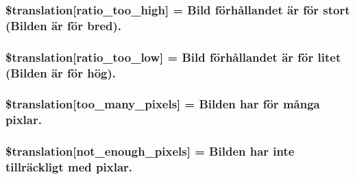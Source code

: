 \subsubsection[{\$translation}]{\setlength{\rightskip}{0pt plus 5cm}\$translation\mbox{[}\textquotesingle{}ratio\+\_\+too\+\_\+high\textquotesingle{}\mbox{]} = \textquotesingle{}Bild förhållandet är för stort (Bilden är för bred).\textquotesingle{}}\label{class_8upload_8sv___s_e_8php_a23396f6ce7f31e5e5f1b57580621d982}
\hypertarget{class_8upload_8sv___s_e_8php_ac533b9a479f056b0b8623e4268f068c2}{}
\subsubsection[{\$translation}]{\setlength{\rightskip}{0pt plus 5cm}\$translation\mbox{[}\textquotesingle{}ratio\+\_\+too\+\_\+low\textquotesingle{}\mbox{]} = \textquotesingle{}Bild förhållandet är för litet (Bilden är för hög).\textquotesingle{}}\label{class_8upload_8sv___s_e_8php_ac533b9a479f056b0b8623e4268f068c2}
\hypertarget{class_8upload_8sv___s_e_8php_aa4051ef64e94a3f8295c63cf85544016}{}
\subsubsection[{\$translation}]{\setlength{\rightskip}{0pt plus 5cm}\$translation\mbox{[}\textquotesingle{}too\+\_\+many\+\_\+pixels\textquotesingle{}\mbox{]} = \textquotesingle{}Bilden har för många pixlar.\textquotesingle{}}\label{class_8upload_8sv___s_e_8php_aa4051ef64e94a3f8295c63cf85544016}
\hypertarget{class_8upload_8sv___s_e_8php_a1fe342c27ce61f4ff4e0120ba647033e}{}
\subsubsection[{\$translation}]{\setlength{\rightskip}{0pt plus 5cm}\$translation\mbox{[}\textquotesingle{}not\+\_\+enough\+\_\+pixels\textquotesingle{}\mbox{]} = \textquotesingle{}Bilden har inte tillräckligt med pixlar.\textquotesingle{}}\label{class_8upload_8sv___s_e_8php_a1fe342c27ce61f4ff4e0120ba647033e}
\hypertarget{class_8upload_8sv___s_e_8php_a4ce76e7be0b3a03c2b47f6d70c21832e}{}
